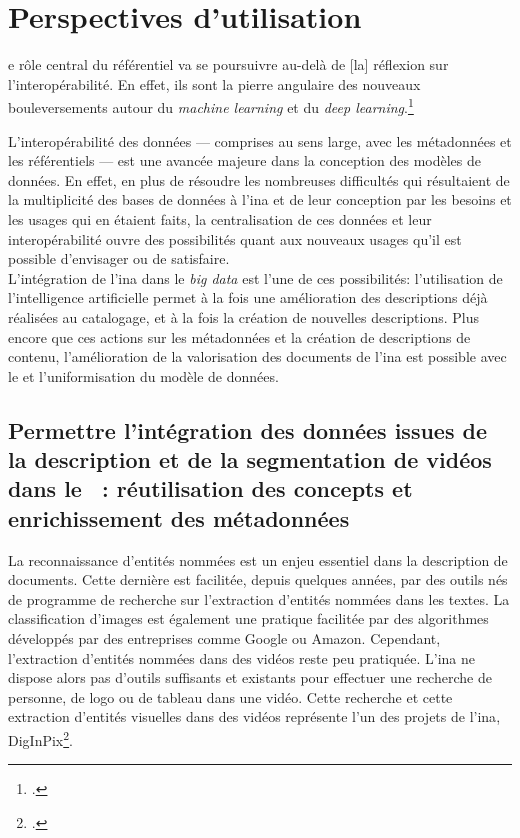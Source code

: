 \section{\label{III-B-3}Perspectives d'utilisation}

\begin{citationLongue}
	[L]e rôle central du référentiel va se poursuivre au-delà de [la] réflexion sur l’interopérabilité. En effet, ils sont la pierre angulaire des nouveaux bouleversements autour du \textit{machine learning} et du \textit{deep learning}.\footcite{poupeau_reflexions_2018}
\end{citationLongue}

L'interopérabilité des données --- comprises au sens large, avec les métadonnées et les référentiels --- est une avancée majeure dans la conception des modèles de données. En effet, en plus de résoudre les nombreuses difficultés qui résultaient de la multiplicité des bases de données à l'\ac{ina} et de leur conception par les besoins et les usages qui en étaient faits, la centralisation de ces données et leur interopérabilité ouvre des possibilités quant aux nouveaux usages qu'il est possible d'envisager ou de satisfaire.\\

L'intégration de l'\ac{ina} dans le \textit{big data} est l'une de ces possibilités: l'utilisation de l'intelligence artificielle permet à la fois une amélioration des descriptions déjà réalisées au catalogage, et à la fois la création de nouvelles descriptions. Plus encore que ces actions sur les métadonnées et la création de descriptions de contenu, l'amélioration de la valorisation des documents de l'\ac{ina} est possible avec le \ldd et l'uniformisation du modèle de données.

\subsection{\label{III-B-3-a}Permettre l’intégration des données issues de la description et de la segmentation de vidéos dans le \ldd : réutilisation des concepts et enrichissement des métadonnées}
	
La reconnaissance d'entités nommées est un enjeu essentiel dans la description de documents. Cette dernière est facilitée, depuis quelques années, par des outils nés de programme de recherche sur l'extraction d'entités nommées dans les textes. La classification d'images est également une pratique facilitée par des algorithmes développés par des entreprises comme Google ou Amazon. Cependant, l'extraction d'entités nommées dans des vidéos reste peu pratiquée. L'\ac{ina} ne dispose alors pas d'outils suffisants et existants pour effectuer une recherche de personne, de logo ou de tableau dans une vidéo. Cette recherche et cette extraction d'entités visuelles dans des vidéos représente l'un des projets de l'\ac{ina}, DigInPix\footcite{institut_national_de_laudiovisuel_diginpix_nodate-1}.\\


